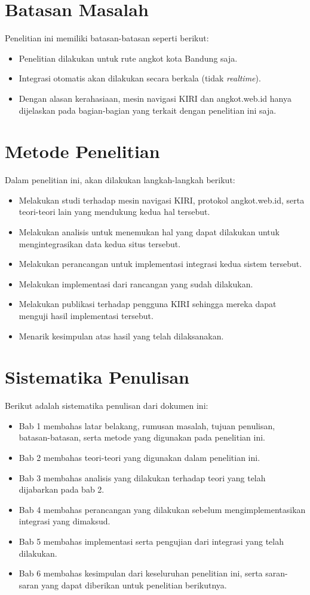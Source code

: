 \section{Batasan Masalah}
\label{sec:batasan_masalah}
Penelitian ini memiliki batasan-batasan seperti berikut:
\begin{itemize}
	\item Penelitian dilakukan untuk rute angkot kota Bandung saja.
	\item Integrasi otomatis akan dilakukan secara berkala (tidak \textit{realtime}).
	\item Dengan alasan kerahasiaan, mesin navigasi KIRI dan angkot.web.id hanya dijelaskan pada bagian-bagian yang terkait dengan penelitian ini saja.
\end{itemize}

\section{Metode Penelitian}
\label{sec:metode_penelitian}
Dalam penelitian ini, akan dilakukan langkah-langkah berikut:
\begin{itemize}
	\item Melakukan studi terhadap mesin navigasi KIRI, protokol angkot.web.id, serta teori-teori lain yang mendukung kedua hal tersebut.
	\item Melakukan analisis untuk menemukan hal yang dapat dilakukan untuk mengintegrasikan data kedua situs tersebut.
	\item Melakukan perancangan untuk implementasi integrasi kedua sistem tersebut.
	\item Melakukan implementasi dari rancangan yang sudah dilakukan.
	\item Melakukan publikasi terhadap pengguna KIRI sehingga mereka dapat menguji hasil implementasi tersebut.
	\item Menarik kesimpulan atas hasil yang telah dilaksanakan.
\end{itemize}

\section{Sistematika Penulisan}
\label{sec:sistematika_penulisan}
Berikut adalah sistematika penulisan dari dokumen ini:
\begin{itemize}
	\item Bab 1 membahas latar belakang, rumusan masalah, tujuan penulisan, batasan-batasan, serta metode yang digunakan pada penelitian ini.
	\item Bab 2 membahas teori-teori yang digunakan dalam penelitian ini. \item Bab 3 membahas analisis yang dilakukan terhadap teori yang telah dijabarkan pada bab 2.
	\item Bab 4 membahas perancangan yang dilakukan sebelum mengimplementasikan integrasi yang dimaksud.
	\item Bab 5 membahas implementasi serta pengujian dari integrasi yang telah dilakukan.
	\item Bab 6 membahas kesimpulan dari keseluruhan penelitian ini, serta saran-saran yang dapat diberikan untuk penelitian berikutnya.
\end{itemize}